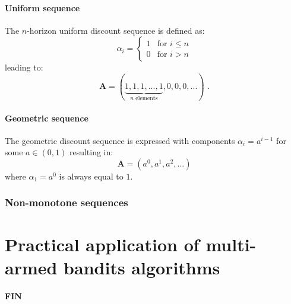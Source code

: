 \documentclass[12pt, a4paper, pdflatex]{report}
\begin{document}
\subsubsection{Uniform sequence}
The $n$-horizon uniform discount sequence is defined as:
\[
 \alpha_i =
  \begin{cases}
   1 & \text{for } i \leq n \\
   0 & \text{for } i > n
  \end{cases}
\]
leading to:
\[
  \mathbf{A} = ( \underbrace{ 1, 1, 1, ..., 1}_{n\text{ elements}}, 0, 0, 0, ... ) \text{ .}
\]
\subsubsection{Geometric sequence}
The geometric discount sequence is expressed with components $\alpha_i = a^{i-1}$ for some $a \in ( 0, 1 )$ resulting in:
$$
\mathbf{A} = \left( a^0, a^1, a^2, ... \right)
$$
where $\alpha_1 = a^0$ is always equal to $1$.

\subsection{Non-monotone sequences}









\chapter{Practical application of multi-armed bandits algorithms}

\newpage
\begin{center} \textbf{\huge \vspace{15pt} FIN} \end{center}

{}

\end{document}
